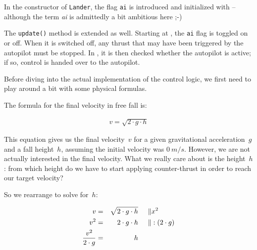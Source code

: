 
In the constructor of \texttt{Lander}, the flag \texttt{ai} is introduced and initialized with \false{} -- although the term \emph{ai} is admittedly a bit ambitious here ;-)


The \texttt{update()} method is extended as well. Starting at , the \texttt{ai} flag is toggled on or off. When it is switched off, any thrust that may have been triggered by the autopilot must be stopped. In , it is then checked whether the autopilot is active; if so, control is handed over to the autopilot.


Before diving into the actual implementation of the control logic, we first need to play around a bit with some physical formulas.

The formula for the final velocity in free fall is:

\begin{align}
	v = \sqrt{2 \cdot g \cdot h} \label{v_eins}
\end{align}

This equation gives us the final velocity~$v$ for a given gravitational acceleration~$g$ and a fall height~$h$, assuming the initial velocity was $\SI{0}{m/s}$. However, we are not actually interested in the final velocity. What we really care about is the height~$h$: from which height do we have to start applying counter-thrust in order to reach our target velocity?

So we rearrange  to solve for~$h$:

\begin{align}
	v             &=& \sqrt{2 \cdot g \cdot h} &\hspace{0.5cm}\| x^2\nonumber\\
	v^2           &=& 2 \cdot g \cdot h        &\hspace{0.5cm}\| :(2 \cdot g)\nonumber\\
	\frac{v^2}{2 \cdot g} &=& h &  \label{h_eins}
\end{align}

